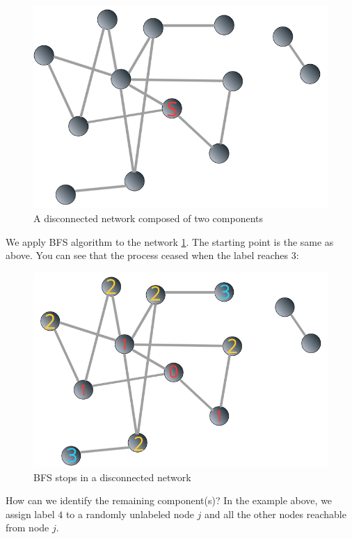 \documentclass[
]{krantz}
\begin{document}
\begin{figure}

{\centering \includegraphics[width=0.65\linewidth]{images/bfsD1} 

}

\caption{A disconnected network composed of two components}\label{fig:bfsD1}
\end{figure}

We apply BFS algorithm to the network \ref{fig:bfsD1}. The starting point is the same as above. You can see that the process ceased when the label reaches \(3\):

\begin{figure}

{\centering \includegraphics[width=0.65\linewidth]{images/bfsD2} 

}

\caption{BFS stops in a disconnected network}\label{fig:bfsD2}
\end{figure}

How can we identify the remaining component(s)? In the example above, we assign label \(4\) to a randomly unlabeled node \(j\) and all the other nodes reachable from node \(j\).
\end{document}
